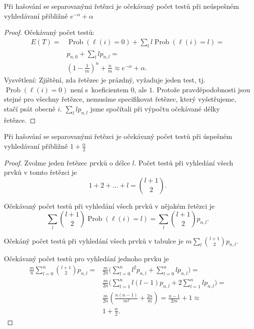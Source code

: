 \documentclass[a4paper,12pt]{article}
\DeclareMathOperator*{\Prob}{Prob}
\begin{document}
\begin{veta}
    Při hašování se separovanými řetězci je 
    očekávaný po\-čet testů při neúspeš\-ném 
    vy\-hledávaní přibližně $e^{-\alpha}+\alpha$
\end{veta}

\begin{proof}
Očekávaný počet testů:
\begin{align*} E(T)=&\Prob(\ell (i)=0)+\sum_ll\Prob(\ell (i)=l)=\\
&p_{n,0}+\sum_llp_{n,l}=\\
&(1-\frac 1m)^n+\frac nm\approx e^{-\alpha}+\alpha .\end{align*}
Vysvětlení: Zjištění, zda řetězec je prázdný, vyžaduje 
jeden test, tj. $\Prob(\ell (i)=0)$ není s~koeficientem $0$, ale $
1$.
Protože pravděpodobnosti jsou stejné pro všechny 
řetězce, nemusíme specifikovat řetězec, který 
vyšetřujeme, stačí psát obecně $i$. $\sum_llp_{
n,l}$ jsme spočítali 
při výpočtu očekávané délky řetězce.
\end{proof}


\begin{veta}
    Při hašování se separovanými řetězci je 
    očekávaný po\-čet testů při úspeš\-ném 
    vy\-hledávaní přibližně $1+\frac{\alpha}{2}$
\end{veta}

\begin{proof}
Zvolme jeden řetězec prvků o délce $l$. 
Počet testů při vyhledání všech prvků 
v tomto řetězci je
$$1+2+\dots+l=\binom {l+1}2.$$

Očekávaný počet testů při vyhledání všech 
prvků v nějakém řetězci je 
$$\sum_l\binom {l+1}2\Prob(\ell (i)=l)=\sum_l\binom {l+1}2p_{n,l}
.$$

Očekáný počet testů při vyhledání všech 
prvků v tabulce je $m\sum_l\binom {l+1}2p_{n,l}$.

Očekávaný počet testů pro 
vyhledání jednoho prvku je 
\begin{align*}\frac mn\sum_{l=0}^n\binom {l+1}2p_{n,l}=&\frac m{2n}\big
(\sum_{l=0}^nl^2p_{n,l}+\sum_{l=0}^nlp_{n,l}\big)=\\
&\frac m{2n}\big(\sum_{l=1}^nl(l-1)p_{n,l}+2\sum_{l=1}^nlp_{n,l}\big
)=\\
&\frac m{2n}(\frac {n(n-1)}{m^2}+\frac {2n}m)=\frac {n-1}{2m}+1\approx\\
&1+\frac {\alpha}2.\end{align*}
\end{proof}
\end{document}
